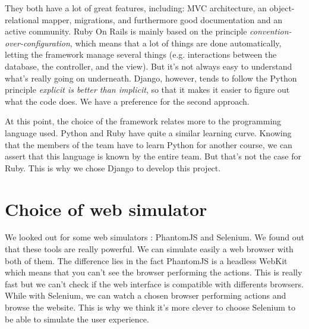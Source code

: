 \documentclass[11pt, a4paper]{article}   	%
\newcommand{\tit}[1]{\textit{#1}}
\begin{document}
They both have a lot of great features, including: MVC architecture, an object-relational mapper, migrations, and furthermore good documentation and an active community.
Ruby On Rails is mainly based on the principle \tit{convention-over-configuration}, which means that a lot of things are done automatically, letting the framework manage several things (e.g. interactions between the database, the controller, and the view). But it's not always easy to understand what's really going on underneath.
Django, however, tends to follow the Python principle \tit{explicit is better than implicit}, so that it makes it easier to figure out what the code does.
We have a preference for the second approach.

\medskip
At this point, the choice of the framework relates more to the programming language used.
Python and Ruby have quite a similar learning curve.
Knowing that the members of the team have to learn Python for another course, we can assert that this language is known by the entire team. But that's not the case for Ruby. This is why we chose Django to develop this project.

\section{Choice of web simulator}

We looked out for some web simulators : PhantomJS and Selenium. We found out that these tools are really powerful. We can simulate easily a web browser with both of them. The difference lies in the fact PhantomJS is a headless WebKit which means that you can't see the browser performing the actions. This is really fast but we can't check if the web interface is compatible with differents browsers. While with Selenium, we can watch a chosen browser performing actions and browse the website. This is why we think it's more clever to choose Selenium to be able to simulate the user experience.
\end{document}
